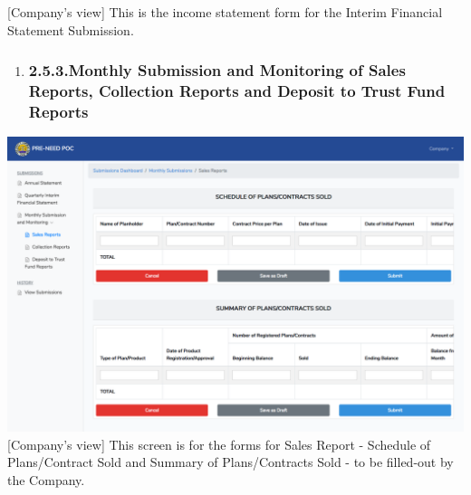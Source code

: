 \documentclass{article}
\begin{document}
[Company’s view] This is the income statement form
for the Interim Financial Statement Submission.%

\begin{enumerate}[noitemsep,topsep=\mdcompacttopsep]%

\item{}
\subsubsection{2.5.3.\hspace*{0.5em}Monthly Submission and Monitoring of Sales Reports, Collection Reports and Deposit to Trust Fund Reports}\label{sec-monthly-submission-and-monitoring-of-sales-reports-collection-reports-and-deposit-to-trust-fund-reports}%
\end{enumerate}%

\noindent{}\includegraphics[keepaspectratio=true]{up-ic-screens/image11}{}[Company’s view] This screen is for the forms for Sales
Report - Schedule of Plans/Contract Sold and Summary of Plans/Contracts
Sold - to be filled-out by the Company.%
\end{document}
